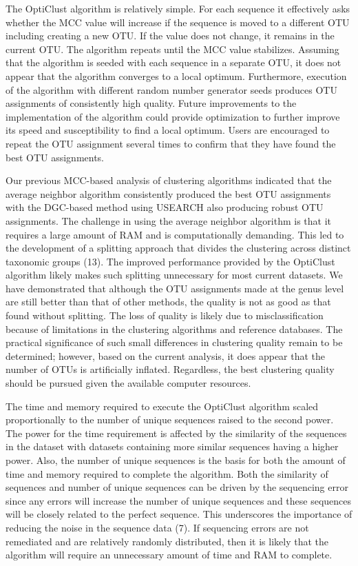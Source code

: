 \documentclass[11pt,]{article}
\begin{document}
The OptiClust algorithm is relatively simple. For each sequence it
effectively asks whether the MCC value will increase if the sequence is
moved to a different OTU including creating a new OTU. If the value does
not change, it remains in the current OTU. The algorithm repeats until
the MCC value stabilizes. Assuming that the algorithm is seeded with
each sequence in a separate OTU, it does not appear that the algorithm
converges to a local optimum. Furthermore, execution of the algorithm
with different random number generator seeds produces OTU assignments of
consistently high quality. Future improvements to the implementation of
the algorithm could provide optimization to further improve its speed
and susceptibility to find a local optimum. Users are encouraged to
repeat the OTU assignment several times to confirm that they have found
the best OTU assignments.

Our previous MCC-based analysis of clustering algorithms indicated that
the average neighbor algorithm consistently produced the best OTU
assignments with the DGC-based method using USEARCH also producing
robust OTU assignments. The challenge in using the average neighbor
algorithm is that it requires a large amount of RAM and is
computationally demanding. This led to the development of a splitting
approach that divides the clustering across distinct taxonomic groups
(13). The improved performance provided by the OptiClust algorithm
likely makes such splitting unnecessary for most current datasets. We
have demonstrated that although the OTU assignments made at the genus
level are still better than that of other methods, the quality is not as
good as that found without splitting. The loss of quality is likely due
to misclassification because of limitations in the clustering algorithms
and reference databases. The practical significance of such small
differences in clustering quality remain to be determined; however,
based on the current analysis, it does appear that the number of OTUs is
artificially inflated. Regardless, the best clustering quality should be
pursued given the available computer resources.

The time and memory required to execute the OptiClust algorithm scaled
proportionally to the number of unique sequences raised to the second
power. The power for the time requirement is affected by the similarity
of the sequences in the dataset with datasets containing more similar
sequences having a higher power. Also, the number of unique sequences is
the basis for both the amount of time and memory required to complete
the algorithm. Both the similarity of sequences and number of unique
sequences can be driven by the sequencing error since any errors will
increase the number of unique sequences and these sequences will be
closely related to the perfect sequence. This underscores the importance
of reducing the noise in the sequence data (7). If sequencing errors are
not remediated and are relatively randomly distributed, then it is
likely that the algorithm will require an unnecessary amount of time and
RAM to complete.
\end{document}

